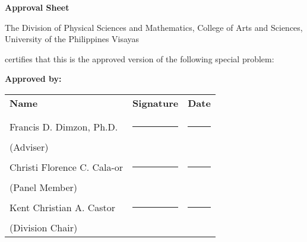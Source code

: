 \begin{center}
\textbf{Approval Sheet}

The Division of Physical Sciences and Mathematics, College of Arts and Sciences, University of the Philippines Visayas 

certifies that this is the approved version of the following special problem:

\end{center}

{\small\textbf{Approved by:}}

\newcommand{\signaturerule}{\rule{10em}{.4pt}}
	\begin{tabular}{lll}
		\bfseries Name  & \bfseries Signature & \bfseries Date\\ \\
		Francis D. Dimzon, Ph.D. &\signaturerule  & \signaturerule\\ 
		\multicolumn{1}{l}{(Adviser)} \\ 
		Christi Florence C. Cala-or &\signaturerule &\signaturerule\\
		\multicolumn{1}{l}{(Panel Member)}\\
		Kent Christian A. Castor &\signaturerule &\signaturerule\\
		\multicolumn{1}{l}{(Division Chair)}

	\end{tabular}
